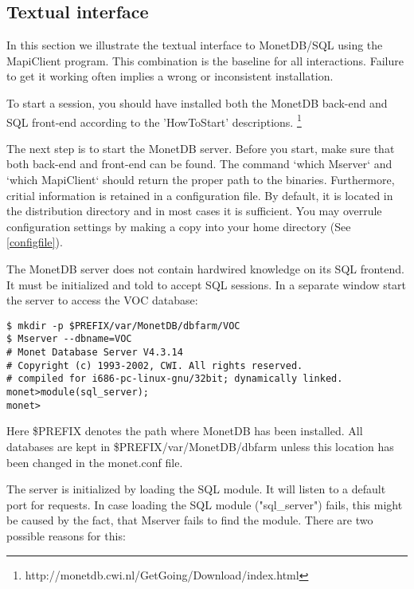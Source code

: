 \documentclass[10pt,twocolumn,fleqn]{article}
\begin{document}
\subsection{Textual interface}
\label{mapi}
In this section we illustrate the textual interface to MonetDB/SQL using the
MapiClient program. This combination is the baseline for all interactions.
Failure to get it working often implies a wrong or inconsistent installation.

To start a session, you should have installed both the
MonetDB back-end and SQL front-end according to the 'HowToStart' descriptions.
\footnote{http://monetdb.cwi.nl/GetGoing/Download/index.html}

The next step is to start the MonetDB server.
Before you start, make sure that both back-end and front-end can be found.
The command `which Mserver` and `which MapiClient` should return the proper path
to the binaries.  
Furthermore, critial information is retained in a configuration file. 
By default, it is located in the distribution directory and in most
cases it is sufficient.
You may overrule configuration settings by making a copy into your 
home directory (See \ref{configfile}).

The MonetDB server does not contain hardwired knowledge on its SQL frontend.
It must be initialized and told to accept SQL sessions. In a separate window
start the server to access the VOC database:

{\footnotesize
\begin{verbatim}
$ mkdir -p $PREFIX/var/MonetDB/dbfarm/VOC
$ Mserver --dbname=VOC 
# Monet Database Server V4.3.14
# Copyright (c) 1993-2002, CWI. All rights reserved.
# compiled for i686-pc-linux-gnu/32bit; dynamically linked.
monet>module(sql_server);
monet>
\end{verbatim}
}

Here \$PREFIX denotes the path where MonetDB has been installed.
All databases are kept in \$PREFIX/var/MonetDB/dbfarm unless this location
has been changed in the monet.conf file.

The server is initialized by loading the SQL module. It will listen
to a default port for requests.
In case loading the SQL module ("sql\_server") fails, this might be caused by
the fact, that Mserver fails to find the module. There are two possible
reasons for this:
\end{document}
